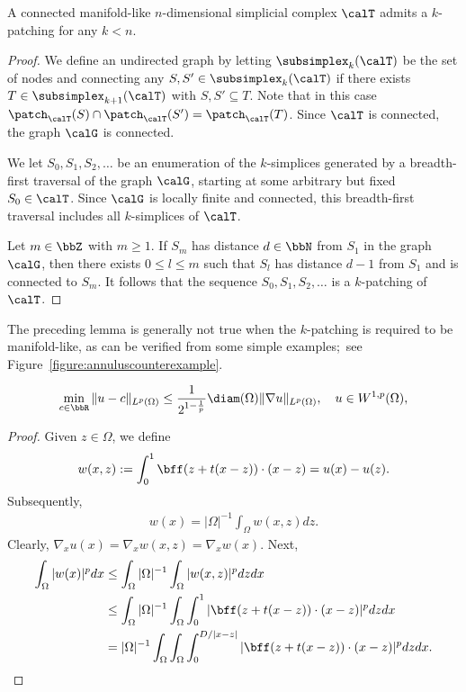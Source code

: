 \begin{lemma}
    A connected manifold-like $n$-dimensional simplicial complex $\calT$ admits a $k$-patching for any $k < n$.
\end{lemma}
\begin{proof}
    We define an undirected graph by letting $\subsimplex_{k}(\calT)$ be the set of nodes 
    and connecting any $S, S' \in \subsimplex_{k}(\calT)$ if there exists $T \in \subsimplex_{k+1}(\calT)$ with $S, S' \subseteq T$. 
    Note that in this case $\patch_{\calT}(S) \cap \patch_{\calT}(S') = \patch_{\calT}(T)$. 
    Since $\calT$ is connected, the graph $\calG$ is connected. 
    
    We let $S_0, S_1, S_2, \dots$ be an enumeration of the $k$-simplices generated by a breadth-first traversal of the graph $\calG$,
    starting at some arbitrary but fixed $S_0 \in \calT$. 
    Since $\calG$ is locally finite and connected, 
    this breadth-first traversal includes all $k$-simplices of $\calT$.
    
    Let $m \in \bbZ$ with $m \geq 1$. If $S_m$ has distance $d \in \bbN$ from $S_1$ in the graph $\calG$,
    then there exists $0 \leq l \leq m$ such that $S_l$ has distance $d-1$ from $S_1$ and is connected to $S_m$. 
    It follows that the sequence $S_0, S_1, S_2, \dots$ is a $k$-patching of $\calT$. 
\end{proof}

The preceding lemma is generally not true when the $k$-patching is required to be manifold-like,
as can be verified from some simple examples;~see Figure~\ref{figure:annuluscounterexample}.

\color{Emerald}
\begin{align}
    \min\limits_{ c \in \bbR }
    \| u - c \|_{L^{p}(\Omega)}
    \leq 
    \frac{1}{ 2^{ 1 - \frac{1}{p} } }
    \diam(\Omega)
    \| \nabla u \|_{L^{p}(\Omega)}
    ,
    \quad 
    u \in W^{1,p}(\Omega)
    ,
\end{align}

\begin{proof}
    Given $z \in \Omega$, we define 
    \[
        w(x,z) 
        := 
        \int_0^1 \bff( z + t(x-z) ) \cdot (x-z)
        =
        u(x) - u(z)
        .
    \]
    Subsequently,
    \begin{align*}
        w(x) = |\Omega|^{-1} \int_{\Omega} w(x,z) dz.
    \end{align*}
    Clearly, $\nabla_{x} u(x) = \nabla_{x} w(x,z) = \nabla_{x} w(x)$.
    Next, 
    \begin{align*}
        \int_{\Omega} | w(x) |^{p} dx
        &\leq 
        \int_{\Omega} |\Omega|^{-1} \int_{\Omega} | w(x,z) |^{p} dz dx
        \\&\leq 
        \int_{\Omega} |\Omega|^{-1} \int_{\Omega} \int_0^1 | \bff( z + t(x-z) ) \cdot (x-z) |^{p} dz dx
        \\&= 
        |\Omega|^{-1} \int_{\Omega} \int_{\Omega} \int_0^{D/|x-z|} | \bff( z + t(x-z) ) \cdot (x-z) |^{p} dz dx
        .
    \end{align*}

\end{proof}
\color{black}

